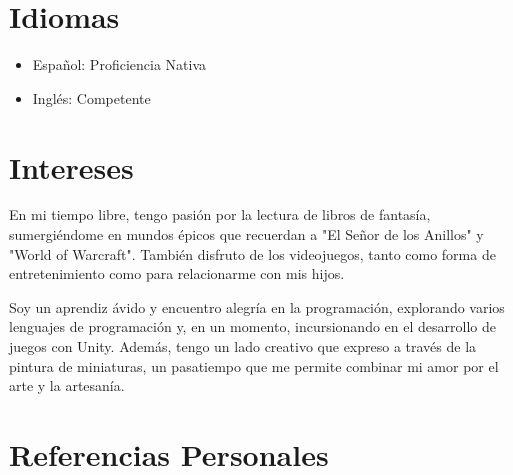 \documentclass[a4paper,10pt]{article}
\begin{document}
\section*{Idiomas}
\begin{itemize}
    \item Español: Proficiencia Nativa
    \item Inglés: Competente
\end{itemize}

\section*{Intereses}
En mi tiempo libre, tengo pasión por la lectura de libros de fantasía, sumergiéndome en mundos épicos que recuerdan a "El Señor de los Anillos" y "World of Warcraft". También disfruto de los videojuegos, tanto como forma de entretenimiento como para relacionarme con mis hijos.

Soy un aprendiz ávido y encuentro alegría en la programación, explorando varios lenguajes de programación y, en un momento, incursionando en el desarrollo de juegos con Unity. Además, tengo un lado creativo que expreso a través de la pintura de miniaturas, un pasatiempo que me permite combinar mi amor por el arte y la artesanía.

\section*{Referencias Personales}
\renewcommand{\refname}{}
\end{document}
